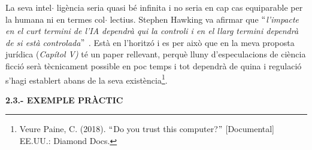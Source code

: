 \documentclass[12pt]{article}
\renewcommand{\_}{\kern-1.5pt\textunderscore\kern-1.5pt}
\begin{document}
\begin{itemize}
\vspace{\baselineskip}
\begin{justify}
La seva intel$ \cdot $ ligència seria quasi bé infinita i no seria en cap cas equiparable per la humana ni en termes col$ \cdot $ lectius. Stephen Hawking va afirmar que \textit{$``$l’impacte en el curt termini de l’IA dependrà qui la controli i en el llarg termini dependrà de si està controlada$"$ . }Està en l’horitzó i es per això que en la meva proposta jurídica (\textit{Capítol V)} té un paper rellevant, perquè lluny d’especulacions de ciència ficció serà tècnicament possible en poc temps i tot dependrà de quina i regulació s’hagi establert abans de la seva existència\footnote{ Veure Paine, C. (2018). $``$Do you trust this computer?$"$  [Documental] EE.UU.: Diamond Docs. }.
\end{justify}\par


\vspace{\baselineskip}

\vspace{\baselineskip}

\vspace{\baselineskip}

\vspace{\baselineskip}

\vspace{\baselineskip}

\vspace{\baselineskip}

\vspace{\baselineskip}

\vspace{\baselineskip}

\vspace{\baselineskip}

\vspace{\baselineskip}

\vspace{\baselineskip}

\vspace{\baselineskip}

\vspace{\baselineskip}

\vspace{\baselineskip}

\vspace{\baselineskip}

\vspace{\baselineskip}
\textbf{2.3.- EXEMPLE PRÀCTIC}\par



\end{itemize}
\end{document}
